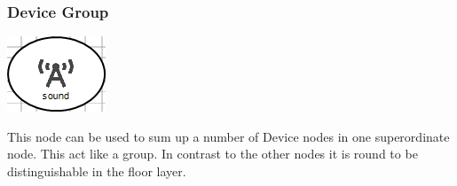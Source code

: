 \subsubsection{Device Group}
\noindent\begin{minipage}{0.15\textwidth}%
	\includegraphics[width=\linewidth]{assets/images/group}
\end{minipage}%
\hfill%
\begin{minipage}{0.8\textwidth}
	This node can be used to sum up a number of Device nodes in one superordinate node. This act like a group. In contrast to the other nodes it is round to be distinguishable in the floor layer.
\end{minipage}

